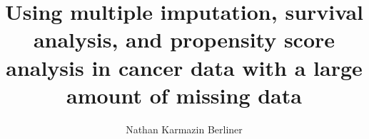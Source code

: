 \documentclass[12pt]{ruthesis}
\title{Using multiple imputation, survival analysis, and propensity score analysis in cancer data with a large amount of missing data}
\author{Nathan Karmazin Berliner}
\begin{document}
  \begin{frontmatter}
   \maketitle
   
   \tableofcontents
   \listoffigures
   \listoftables
  \end{frontmatter}







\appendix



%


\end{document}
